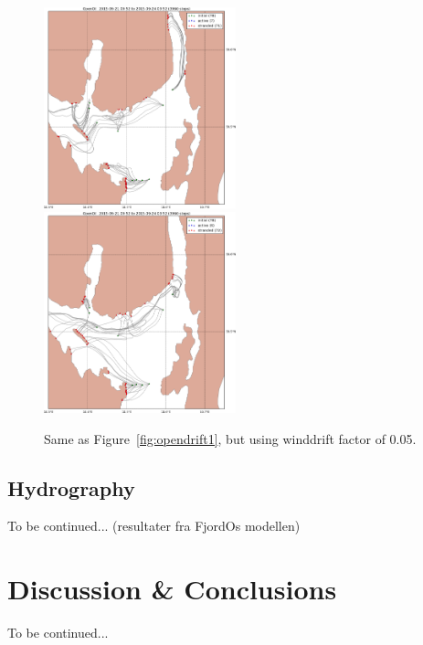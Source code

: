 \documentclass[12pt,a4paper,english]{article}
\begin{document}
\begin{figure}[ht]
\centerline{
\includegraphics*[width=0.495\textwidth]{Opendrift_simulations/LTR3/tokt_drifters_winddrift_0p5_radius_0_num_6_plusminus_2p5h_crop}
\includegraphics*[width=0.495\textwidth]{Opendrift_simulations/LTR3/tokt_drifters_winddrift_0p5_radius_0_num_6_plusminus_2p5h_norkyst_crop}
}
\caption{\small
Same as Figure~\ref{fig:opendrift1}, but using winddrift factor of 0.05.
}
\label{fig:opendrift4}
\end{figure}


\subsection{Hydrography}

To be continued... (resultater fra FjordOs modellen)

\clearpage

\section{Discussion \& Conclusions}

To be continued...
\end{document}
